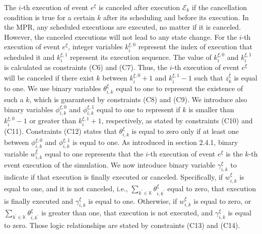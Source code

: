 \documentclass[]{interact}
\theoremstyle{plain}%
\theoremstyle{definition}
\theoremstyle{remark}
\begin{document}
The $i$-th execution of event $e^{\xi}$ is canceled after execution $\mathcal{E}_k$ if the cancellation condition is true for a certain $k$ after its scheduling and before its execution. In the MPR, any scheduled executions are executed, no matter if it is canceled. However, the canceled executions will not lead to any state change. For the $i$-th execution of event $e^{\xi}$, integer variables $k^{\xi,0}_i$ represent the index of execution that scheduled it and $k^{\xi,1}_i$ represent its execution sequence. The value of $k^{\xi,0}_i$ and $k^{\xi,1}_i$ is calculated as constraints (C6) and (C7). Thus, the $i$-th execution of event $e^{\xi}$ will be canceled if there exist $k$ between $k^{\xi,0}_i+1$ and $k^{\xi,1}_i-1$ such that $z^{\bar{\xi}}_{k}$ is equal to one. We use binary variables $\theta^{\xi}_{i,k}$ equal to one to represent the existence of such a $k$, which is guaranteed by constraints (C8) and (C9).  We introduce also binary variables $\phi^{\xi,0}_{i,k}$ and $\phi^{\xi,1}_{i,k}$ equal to one to represent if $k$ is smaller than $k^{\xi,0}_i-1$ or greater than $k^{\xi,1}_i+1$, respectively, as stated by constraints (C10) and (C11). Constraints (C12) states that $\theta^{\xi}_{i,k}$ is equal to zero only if at least one between $\phi^{\xi,0}_{i,k}$ and $\phi^{\xi,1}_{i,k}$ is equal to one. As introduced in section 2.4.1, binary variable $w^{\xi}_{i,k}$ equal to one represents that the $i$-th execution of event $e^{\xi}$ is the $k$-th event execution of the simulation. We now introduce binary variable $\gamma^{\xi}_{i,k}$ to indicate if that execution is finally executed or canceled. Specifically, if $w^{\xi}_{i,k}$ is equal to one, and it is not canceled, i.e., $\sum_{k^{'}\in \mathbb{K}}\theta^{\xi}_{i,k^{'}}$ equal to zero, that execution is finally executed and $\gamma^{\xi}_{i,k}$ is equal to one. Otherwise, if $w^{\xi}_{i,k}$ is equal to zero, or $\sum_{k^{'}\in \mathbb{K}}\theta^{\xi}_{i,k^{'}}$ is greater than one, that execution is not executed, and $\gamma^{\xi}_{i,k}$ is equal to zero. Those logic relationships are stated by constraints (C13) and (C14). 
\end{document}
